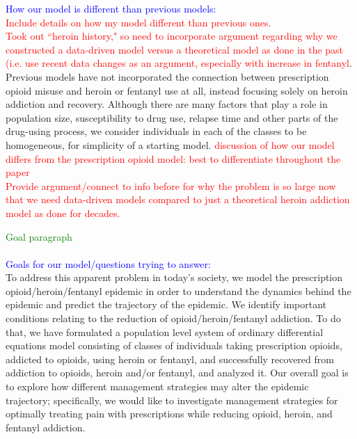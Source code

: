 \documentclass[12pt]{article}
\begin{document}
\textcolor{blue}{How our model is different than previous models:} \\
\textcolor{red}{Include details on how my model different than previous ones.} \\
 \textcolor{red}{Took out ``heroin history," so need to incorporate argument regarding why we constructed a data-driven model versus a theoretical model as done in the past (i.e. use recent data changes as an argument, especially with increase in fentanyl}. Previous models have not incorporated the connection between prescription opioid misuse and heroin or fentanyl use at all, instead focusing solely on heroin addiction and recovery. Although there are many factors that play a role in population size, susceptibility to drug use, relapse time and other parts of the drug-using process, we consider individuals in each of the classes to be homogeneous, for simplicity of a starting model. \textcolor{red}{discussion of how our model differs from the prescription opioid model: best to differentiate throughout the paper} \\
 \textcolor{red}{Provide argument/connect to info before for why the problem is so large now that we need data-driven models compared to just a theoretical heroin addiction model as done for decades.}


\textcolor{green}{Goal paragraph} \\ \\
\textcolor{blue}{Goals for our model/questions trying to answer:} \\
To address this apparent problem in today's society, we model the prescription opioid/heroin/fentanyl epidemic in order to understand the dynamics behind the epidemic and predict the trajectory of the epidemic. We identify important conditions relating to the reduction of opioid/heroin/fentanyl addiction. To do that, we have formulated a population level system of ordinary differential equations model consisting of classes of individuals taking prescription opioids, addicted to opioids, using heroin or fentanyl, and successfully recovered from addiction to opioids, heroin and/or fentanyl, and analyzed it. Our overall goal is to explore how different management strategies may alter the epidemic trajectory; specifically, we would like to investigate management strategies for optimally treating pain with prescriptions while reducing opioid, heroin, and fentanyl addiction.
\end{document}
